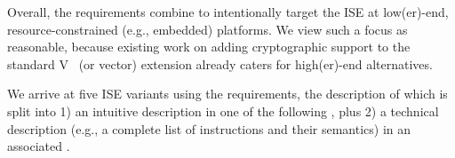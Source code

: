 \noindent
Overall, the requirements combine to intentionally target the ISE at 
 low(er)-end,
resource-constrained (e.g., embedded) platforms.  
We view such a focus as reasonable, because existing work on adding
cryptographic support to the
standard V~\cite[Section 21]{RV:ISA:I:19}
         (or vector) 
         extension
already caters for
high(er)-end
alternatives.

We arrive at five ISE variants using the requirements, the description of 
which is split into
1) an 
   intuitive 
   description in one of the following \SEC[s],
   plus
2) a
   technical
   description
   (e.g., a complete list of instructions and their semantics)
   in an associated \APPX.

